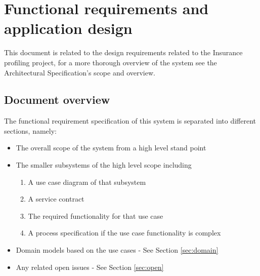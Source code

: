 \documentclass{article}
\begin{document}
	\pagebreak


\section{Functional requirements and application design}
This document is related to the design requirements related to the Insurance profiling project, for a more thorough overview of the system see the Architectural Specification's scope and overview.
\subsection{Document overview}
The functional requirement specification of this system is separated into different sections, namely:
\begin{itemize}
	\item The overall scope of the system from a high level stand point
	\item The smaller subsystems of the high level scope including
		\begin{enumerate}
			\item A use case diagram of that subsystem
			\item A service contract 
			\item The required functionality for that use case
			\item A process specification if the use case functionality is complex
		\end{enumerate}
	\item Domain models based on the use cases - See Section \ref{sec:domain}
	\item Any related open issues - See Section \ref{sec:open}
\end{itemize}
\end{document}
